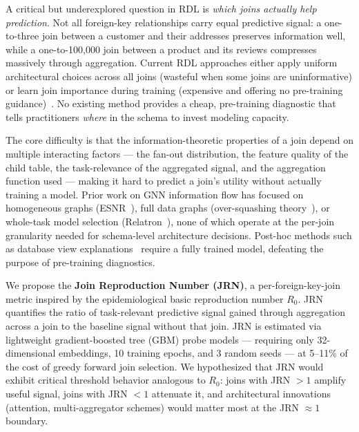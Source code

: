 \documentclass[11pt,letterpaper]{article}
\begin{document}
A critical but underexplored question in RDL is \emph{which joins actually help prediction}. Not all foreign-key relationships carry equal predictive signal: a one-to-three join between a customer and their addresses preserves information well, while a one-to-100,000 join between a product and its reviews compresses massively through aggregation. Current RDL approaches either apply uniform architectural choices across all joins (wasteful when some joins are uninformative) or learn join importance during training (expensive and offering no pre-training guidance)~\citep{Chen2025, Ferrini2024a}. No existing method provides a cheap, pre-training diagnostic that tells practitioners \emph{where} in the schema to invest modeling capacity.

The core difficulty is that the information-theoretic properties of a join depend on multiple interacting factors --- the fan-out distribution, the feature quality of the child table, the task-relevance of the aggregated signal, and the aggregation function used --- making it hard to predict a join's utility without actually training a model. Prior work on GNN information flow has focused on homogeneous graphs (ESNR~\citep{Dong2023}), full data graphs (over-squashing theory~\citep{Topping2022, DiGiovanni2023}), or whole-task model selection (Relatron~\citep{Chen2026}), none of which operate at the per-join granularity needed for schema-level architecture decisions. Post-hoc methods such as database view explanations~\citep{Rissaki2025} require a fully trained model, defeating the purpose of pre-training diagnostics.

We propose the \textbf{Join Reproduction Number (JRN)}, a per-foreign-key-join metric inspired by the epidemiological basic reproduction number $R_0$. JRN quantifies the ratio of task-relevant predictive signal gained through aggregation across a join to the baseline signal without that join. JRN is estimated via lightweight gradient-boosted tree (GBM) probe models --- requiring only 32-dimensional embeddings, 10 training epochs, and 3 random seeds --- at 5--11\% of the cost of greedy forward join selection. We hypothesized that JRN would exhibit critical threshold behavior analogous to $R_0$: joins with JRN $> 1$ amplify useful signal, joins with JRN $< 1$ attenuate it, and architectural innovations (attention, multi-aggregator schemes) would matter most at the JRN $\approx 1$ boundary.
\end{document}
